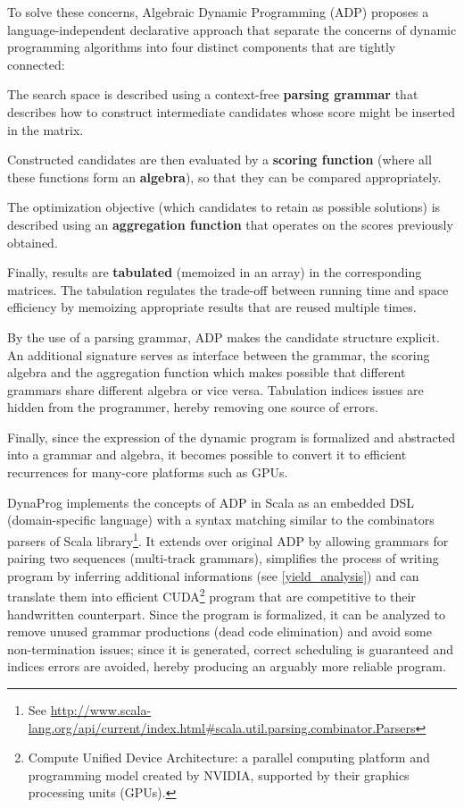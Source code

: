 To solve these concerns, Algebraic Dynamic Programming (ADP) \cite{adp} proposes a language-independent declarative approach that separate the concerns of dynamic programming algorithms into four distinct components that are tightly connected:\ol
\item The search space is described using a context-free \textbf{parsing grammar} that describes how to construct intermediate candidates whose score might be inserted in the matrix.
\item Constructed candidates are then evaluated by a \textbf{scoring function} (where all these functions form an \textbf{algebra}), so that they can be compared appropriately.
\item The optimization objective (which candidates to retain as possible solutions) is described using an \textbf{aggregation function} that operates on the scores previously obtained.
\item Finally, results are \textbf{tabulated} (memoized in an array) in the corresponding matrices. The tabulation regulates the trade-off between running time and space efficiency by memoizing appropriate results that are reused multiple times.
\ole

By the use of a parsing grammar, ADP makes the candidate structure explicit. An additional signature serves as interface between the grammar, the scoring algebra and the aggregation function which makes possible that different grammars share different algebra or vice versa. Tabulation indices issues are hidden from the programmer, hereby removing one source of errors.

Finally, since the expression of the dynamic program is formalized and abstracted into a grammar and algebra, it becomes possible to convert it to efficient recurrences for many-core platforms such as GPUs. \cite{adp_gpu}

DynaProg implements the concepts of ADP in Scala as an embedded DSL (domain-specific language) with a syntax matching similar to the combinators parsers of Scala library\footnote{See \url{http://www.scala-lang.org/api/current/index.html\#scala.util.parsing.combinator.Parsers}}. It extends over original ADP by allowing grammars for pairing two sequences (multi-track grammars), simplifies the process of writing program by inferring additional informations (see \ref{yield_analysis}) and can translate them into efficient CUDA\footnote{Compute Unified Device Architecture: a parallel computing platform and programming model created by NVIDIA, supported by their graphics processing units (GPUs).} program that are competitive to their handwritten counterpart. Since the program is formalized, it can be analyzed to remove unused grammar productions (dead code elimination) and avoid some non-termination issues; since it is generated, correct scheduling is guaranteed and indices errors are avoided, hereby producing an arguably more reliable program.

